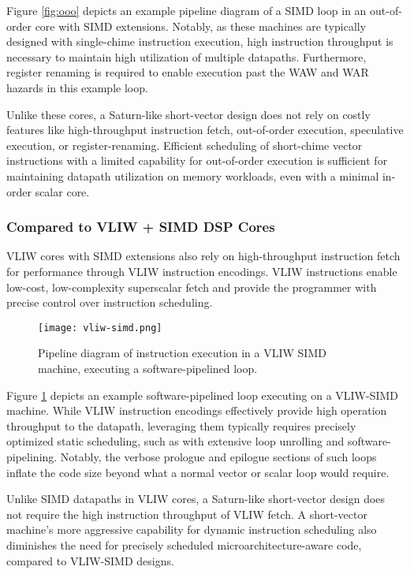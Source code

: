 Figure \ref{fig:ooo} depicts an example pipeline diagram of a SIMD loop in an out-of-order core with SIMD extensions.
Notably, as these machines are typically designed with single-chime instruction execution, high instruction throughput is necessary to maintain high utilization of multiple datapaths.
Furthermore, register renaming is required to enable execution past the WAW and WAR hazards in this example loop.

Unlike these cores, a Saturn-like short-vector design does not rely on costly features like high-throughput instruction fetch, out-of-order execution, speculative execution, or register-renaming.
Efficient scheduling of short-chime vector instructions with a limited capability for out-of-order execution is sufficient for maintaining datapath utilization on memory workloads, even with a minimal in-order scalar core.

\subsubsection{Compared to VLIW + SIMD DSP Cores}

VLIW cores with SIMD extensions also rely on high-throughput instruction fetch for performance through VLIW instruction encodings.
VLIW instructions enable low-cost, low-complexity superscalar fetch and provide the programmer with precise control over instruction scheduling.

\begin{figure}[h]
  \centering
  \texttt{[image: vliw-simd.png]}
  \caption{Pipeline diagram of instruction execution in a VLIW SIMD machine, executing a software-pipelined loop.}
  \label{fig:vliw}
\end{figure}

Figure \ref{fig:vliw} depicts an example software-pipelined loop executing on a VLIW-SIMD machine.
While VLIW instruction encodings effectively provide high operation throughput to the datapath, leveraging them typically requires precisely optimized static scheduling, such as with extensive loop unrolling and software-pipelining.
Notably, the verbose prologue and epilogue sections of such loops inflate the code size beyond what a normal vector or scalar loop would require.

Unlike SIMD datapaths in VLIW cores, a Saturn-like short-vector design does not require the high instruction throughput of VLIW fetch.
A short-vector machine's more aggressive capability for dynamic instruction scheduling also diminishes the need for precisely scheduled microarchitecture-aware code, compared to VLIW-SIMD designs.
